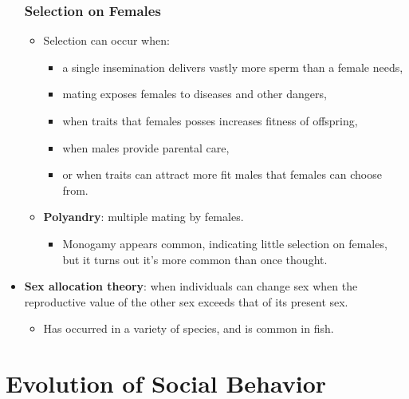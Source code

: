 \documentclass[12pt,a4paper]{article}
\begin{document}
\begin{itemize}
    \subsubsection{Selection on Females}
    \begin{itemize}
        \item Selection can occur when:
            \begin{itemize}
                \item a single insemination delivers vastly more sperm than a female needs,
                \item mating exposes females to diseases and other dangers,
                \item when traits that females posses increases fitness of offspring,
                \item when males provide parental care, 
                \item or when traits can attract more fit males that females can choose from.
            \end{itemize}
        \item \textbf{Polyandry}: multiple mating by females.
            \begin{itemize}
                \item Monogamy appears common, indicating little selection on females, but it turns out it's more common than once thought.
            \end{itemize}
    \end{itemize}
    \item \textbf{Sex allocation theory}: when individuals can change sex when the reproductive value of the other sex exceeds that of its present sex. 
        \begin{itemize}
            \item Has occurred in a variety of species, and is common in fish.
        \end{itemize}
\end{itemize}


\clearpage
\section{Evolution of Social Behavior}
\end{document}
